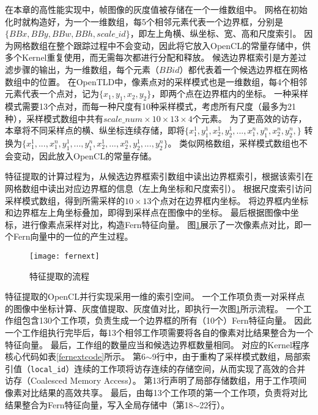 在本章的高性能实现中，帧图像的灰度值被存储在一个一维数组中。
网格在初始化时就构造好，为一个一维数组，每5个相邻元素代表一个边界框，分别是$\{BBx, BBy, BBw, BBh, scale\_id\}$，即左上角横、纵坐标、宽、高和尺度索引。
因为网格数组在整个跟踪过程中不会变动，因此将它放入OpenCL的常量存储中，供多个Kernel重复使用，而无需每次都进行分配和释放。
候选边界框索引是方差过滤步骤的输出，为一维数组，每个元素（$BBid$）都代表着一个候选边界框在网格数组中的位置。
在OpenTLD中，像素点对的采样模式也是一维数组，每4个相邻元素代表一个点对，记为$\{x_1, y_1, x_2, y_2\}$，即两个点在边界框内的坐标。
一种采样模式需要13个点对，而每一种尺度有10种采样模式，考虑所有尺度（最多为21种），采样模式数组中共有$scale\_num
\times10\times13\times4$个元素。
为了更高效的访存，本章将不同采样点的横、纵坐标连续存储，即将$\{x^1_1, y^1_1, x^1_2, y^1_2, ...,x^n_1, y^n_1, x^n_2, y^n_2,\}$
转换为$\{x^1_1, ..., x^n_1, y^1_1, ... , y^n_1, x^1_2, ..., x^n_2, y^1_2, ..., y^n_2\}$。
类似网格数组，采样模式数组也不会变动，因此放入OpenCL的常量存储。

特征提取的计算过程为，从候选边界框索引数组中读出边界框索引，根据该索引在网格数组中读出对应边界框的信息（左上角坐标和尺度索引）。
根据尺度索引访问采样模式数组，得到所需采样的$10\times13$个点对在边界框内坐标。
将边界框内坐标和边界框左上角坐标叠加，即得到采样点在图像中的坐标。
最后根据图像中坐标，进行像素点采样对比，构造Fern特征向量。
图\ref{fernext}展示了一次像素点对比，即一个Fern向量中的一位的产生过程。

\begin{figure}[htb]
  \centering
  \texttt{[image: fernext]}
  \caption{特征提取的流程}
  \label{fernext}
\end{figure}

特征提取的OpenCL并行实现采用一维的索引空间。
一个工作项负责一对采样点的图像中坐标计算、灰度值提取、灰度值对比，即执行一次图\ref{fernext}所示流程。
一个工作组包含130个工作项，负责生成一个边界框的所有（10个）Fern特征向量。
因此一个工作组执行完毕后，每13个相邻工作项需要将各自的像素对比结果整合为一个特征向量。
最后，工作组的数量应当和候选边界框数量相同。
对应的Kernel程序核心代码如表\ref{fernextcode}所示。
第6$\sim$9行中，由于重构了采样模式数组，局部索引值（\texttt{local\_id}）连续的工作项将访存连续的存储空间，从而实现了高效的合并访存（Coalesced Memory Access）。
第13行声明了局部存储数组，用于工作项间像素对比结果的高效共享。
最后，由每13个工作项的第一个工作项，负责将对比结果整合为Fern特征向量，写入全局存储中（第18$\sim$22行）。


